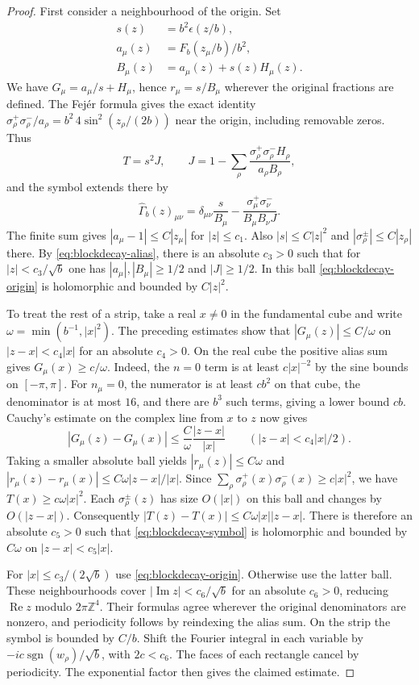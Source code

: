\begin{proof}
First consider a neighbourhood of the origin. Set
\begin{align*}
 s(z)&=b^2\epsilon(z/b),\\
 a_\mu(z)&=F_b(z_\mu/b)/b^2,\\
 B_\mu(z)&=a_\mu(z)+s(z)H_\mu(z).
\end{align*}
We have $G_\mu=a_\mu/s+H_\mu$, hence $r_\mu=s/B_\mu$ wherever the
original fractions are defined. The Fej\'er formula gives the exact identity
$\sigma_\rho^+\sigma_\rho^-/a_\rho=b^2\,4\sin^2(z_\rho/(2b))$ near the origin,
including removable zeros. Thus
\[
 T=s^2 J,\qquad
 J=1-\sum_\rho\frac{\sigma_\rho^+\sigma_\rho^- H_\rho}{a_\rho B_\rho},
\]
and the symbol extends there by
\begin{equation}\label{eq:blockdecay-origin}
 \widehat\Gamma_b(z)_{\mu\nu}
  =\delta_{\mu\nu}\frac{s}{B_\mu}
   -\frac{\sigma_\mu^+\sigma_\nu^-}{B_\mu B_\nu J}.
\end{equation}
The finite sum gives $|a_\mu-1|\le C|z_\mu|$ for $|z|\le c_1$.
Also $|s|\le C|z|^2$ and $|\sigma_\rho^\pm|\le C|z_\rho|$ there.
By \eqref{eq:blockdecay-alias}, there is an absolute $c_3>0$ such that for
$|z|<c_3/\sqrt b$ one has $|a_\mu|,|B_\mu|\ge1/2$ and $|J|\ge1/2$.
In this ball \eqref{eq:blockdecay-origin} is holomorphic and bounded by $C|z|^2$.

To treat the rest of a strip, take a real $x\ne0$ in the fundamental cube
and write $\omega=\min(b^{-1},|x|^2)$. The preceding estimates show that
$|G_\mu(z)|\le C/\omega$ on $|z-x|<c_4|x|$ for an absolute $c_4>0$.
On the real cube the positive alias sum gives $G_\mu(x)\ge c/\omega$.
Indeed, the $n=0$ term is at least $c|x|^{-2}$ by the sine bounds on
$[-\pi,\pi]$. For $n_\mu=0$, the numerator is at least $cb^2$ on that cube,
the denominator is at most $16$, and there are $b^3$ such terms, giving a
lower bound $cb$. Cauchy's estimate on the complex line from $x$ to $z$
now gives
\[
 |G_\mu(z)-G_\mu(x)|\le \frac C\omega \frac{|z-x|}{|x|}
 \qquad (|z-x|<c_4|x|/2).
\]
Taking a smaller absolute ball yields $|r_\mu(z)|\le C\omega$ and
$|r_\mu(z)-r_\mu(x)|\le C\omega |z-x|/|x|$. Since
$\sum_\rho\sigma_\rho^+(x)\sigma_\rho^-(x)\ge c|x|^2$, we have
$T(x)\ge c\omega |x|^2$. Each $\sigma_\rho^\pm(z)$ has size $O(|x|)$ on this
ball and changes by $O(|z-x|)$. Consequently
$|T(z)-T(x)|\le C\omega |x||z-x|$. There is therefore an absolute $c_5>0$
such that \eqref{eq:blockdecay-symbol} is holomorphic and bounded by $C\omega$ on
$|z-x|<c_5|x|$.

For $|x|\le c_3/(2\sqrt b)$ use \eqref{eq:blockdecay-origin}. Otherwise use the latter
ball. These neighbourhoods cover $|\operatorname{Im}z|<c_6/\sqrt b$ for an
absolute $c_6>0$, reducing $\operatorname{Re}z$ modulo $2\pi\mathbb Z^4$.
Their formulas agree wherever the original denominators are nonzero, and
periodicity follows by reindexing the alias sum. On the strip the symbol
is bounded by $C/b$. Shift the Fourier integral in each variable by
$-i c\operatorname{sgn}(w_\rho)/\sqrt b$, with $2c<c_6$. The faces of each
rectangle cancel by periodicity. The exponential factor then gives the
claimed estimate.


\end{proof}
